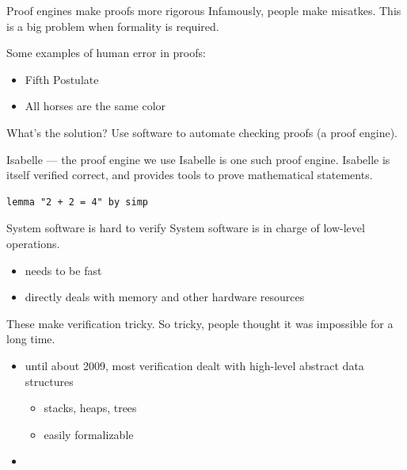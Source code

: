 \documentclass{beamer}
\begin{document}
\begin{frame}{Proof engines make proofs more rigorous}
    Infamously, people make misatkes.
    This is a big problem when formality is required.

    Some examples of human error in proofs:
    \begin{itemize}
        \item Fifth Postulate
        \item All horses are the same color
    \end{itemize}

    What's the solution?
    Use software to automate checking proofs (a proof engine).

\end{frame}

\begin{frame}[fragile]{Isabelle --- the proof engine we use}
    Isabelle is one such proof engine.
    Isabelle is itself verified correct, and provides tools to prove mathematical statements.
    \begin{lstlisting}
lemma "2 + 2 = 4" by simp
    \end{lstlisting}
\end{frame}


\begin{frame}{System software is hard to verify}
    System software is in charge of low-level operations.
    \begin{itemize}
        \item needs to be fast
        \item directly deals with memory and other hardware resources
    \end{itemize}
    These make verification tricky.
    So tricky, people thought it was impossible for a long time.
    \begin{itemize}
        \item until about 2009, most verification dealt with high-level abstract data structures
        \begin{itemize}
            \item stacks, heaps, trees
            \item easily formalizable
        \end{itemize}
        \item 
    \end{itemize}
\end{frame}
\end{document}
